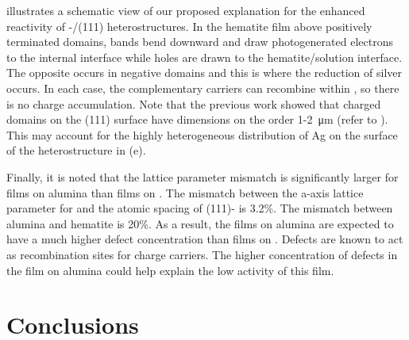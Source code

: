  illustrates a schematic view of our proposed explanation for the
enhanced reactivity of \textalpha-/(111) heterostructures. In the
hematite film above positively terminated domains, bands bend downward and draw
photogenerated electrons to the internal interface while holes are drawn to the
hematite/solution interface.  The opposite occurs in negative domains and this is where
the reduction of silver occurs.  In each case, the complementary carriers can recombine
within , so there is no charge accumulation.  Note that the previous work
showed that charged domains on the (111) surface have dimensions on the order
1-2~\si{\micro\meter} (refer to ).  This may account for the highly
heterogeneous distribution of Ag on the surface of the heterostructure in
(e).

Finally, it is noted that the lattice parameter mismatch is significantly larger for 
films on alumina than films on . The mismatch between the 
a-axis lattice parameter for  and the atomic spacing of 
(111)- is 3.2\%. The mismatch between alumina and hematite is 
\texttildelow{}20\%. As a result, the films on alumina are expected to 
have a much higher defect concentration than films on . 
Defects are known to act as recombination sites for charge carriers. 
The higher concentration of defects in the film on alumina could help 
explain the low activity of this film.


\section{Conclusions}
\label{sec:single.crystal.conclusions}


